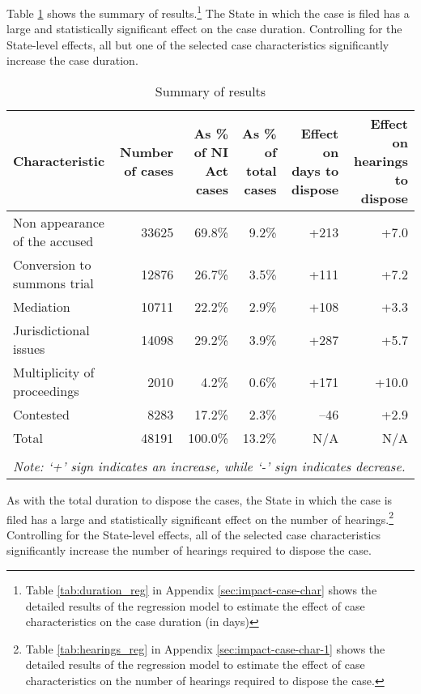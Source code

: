 Table \ref{tab:summary_results} shows the summary of results.\footnote{Table \ref{tab:duration_reg} in Appendix \ref{sec:impact-case-char} shows the detailed results of the regression model to estimate the effect of case characteristics on the case duration (in days)} The State in which the case is filed has a large and statistically significant effect on the case duration. Controlling for the State-level effects, all but one of the selected case characteristics significantly increase the case duration.

{\footnotesize \begin{longtable}{@{}p{2.5cm}rrrrr}
 \caption{Summary of results}\label{tab:summary_results}\\
 \toprule
 \textbf{Characteristic} & \multicolumn{1}{p{2cm}}{\textbf{Number of cases}} &
 \multicolumn{1}{p{2cm}}{\textbf{As \% of NI Act cases}}
 & \multicolumn{1}{p{2cm}}{\textbf{As \% of total cases}}
 & \multicolumn{1}{p{2cm}}{\textbf{Effect on days to dispose}} &
 \multicolumn{1}{p{2cm}}{\textbf{Effect on hearings to dispose}}
 \\
 \midrule
 Non appearance of the accused & 33625 & 69.8\% & 9.2\% & +213 & +7.0 \\ \midrule
 Conversion to summons trial & 12876 & 26.7\% & 3.5\% & +111 & +7.2 \\ \midrule
 Mediation & 10711 & 22.2\% & 2.9\% & +108 & +3.3 \\ \midrule
 Jurisdictional issues & 14098 & 29.2\% & 3.9\% & +287 & +5.7 \\ \midrule
 Multiplicity of proceedings & 2010 & 4.2\% & 0.6\% & +171 & +10.0 \\ \midrule
 Contested & 8283 & 17.2\% & 2.3\% & --46 & +2.9 \\ \midrule
 Total & 48191 & 100.0\% & 13.2\% & N/A & N/A \\
 \bottomrule
 \\
 \multicolumn{6}{l}{{\footnotesize \emph{Note: `+' sign
 indicates an increase, while `-' sign indicates decrease.}}}\\
\end{longtable}
}

As with the total duration to dispose the cases, the State in which the case is filed has a large and statistically significant effect on the number of hearings.\footnote{Table \ref{tab:hearings_reg} in Appendix \ref{sec:impact-case-char-1} shows the detailed results of the regression model to estimate the effect of case characteristics on the number of hearings required to dispose the case.} Controlling for the State-level effects, all of the selected case characteristics significantly increase the number of hearings required to dispose the case.

